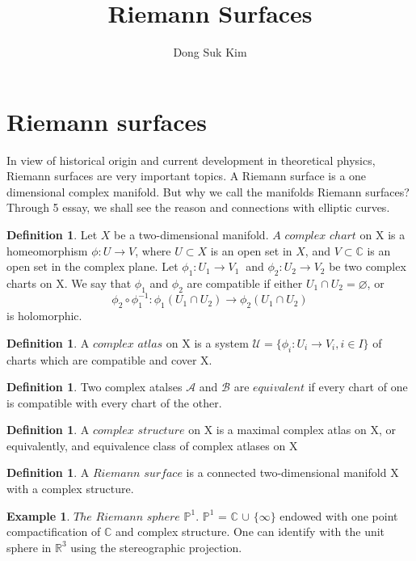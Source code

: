 \documentclass[11pt]{amsart}
\theoremstyle{definition}
\newtheorem{exmp}[thm]{Example}
\newtheorem{defn}[thm]{Definition}
\begin{document}
\title[]
{Riemann Surfaces}
\author{Dong Suk Kim}


\maketitle
\section{Riemann surfaces}
In view of historical origin and current development in theoretical physics, Riemann surfaces are very important topics. A Riemann surface is a one dimensional complex manifold. But why we call the manifolds Riemann surfaces? Through 5 essay, we shall see the reason and connections with elliptic curves. 

\begin{defn} Let $X$ be a two-dimensional manifold. $A$ $complex$ $chart $ on X is a homeomorphism $ \phi : U \to V $, where $U \subset X$ is an open set in $X$, and $V \subset \mathbb{C}$ is an open set in the complex plane. Let $\phi_1 : U_1 \to V_1\ $ and $\phi_2 : U_2 \to V_2 $ be two complex charts on X. We say that $\phi_1$ and $\phi_2$ are compatible if  either $ U_1 \cap U_2 = \varnothing $, or 
\begin{equation*} \phi_2 \circ \phi_1^{-1} : \phi_1(U_1 \cap U_2) \to \phi_2(U_1 \cap U_2)
\end{equation*} is holomorphic.

\end{defn}
\begin{defn}A $complex$ $atlas$ on X is a system $\mathcal{U} = \{ \phi_i : U_i \to V_i, i \in I \}$ of charts which are compatible and cover X.
\end{defn}
\begin{defn} Two complex atalses $\mathcal{A}$ and $\mathcal{B}$ are $equivalent$ if every chart of one is compatible with every chart of the other.
\end{defn}

\begin{defn} A $complex$ $structure$ on X is a maximal complex atlas on X, or equivalently, and equivalence class of complex atlases on X
\end{defn}

\begin{defn} A $Riemann$ $surface$ is a connected two-dimensional manifold X with a complex structure.
\end{defn} 
\begin{exmp} $The$ $Riemann$ $sphere$ $\mathbb{P}^1$. $\mathbb{P}^1$ = $\mathbb{C}$ $\cup$ $\{\infty \}$ endowed with one point compactification of $\mathbb{C}$ and complex structure. One can identify with the unit sphere in $\mathbb{R}^{3}$ using the stereographic projection.
\end{exmp}
\end{document}

